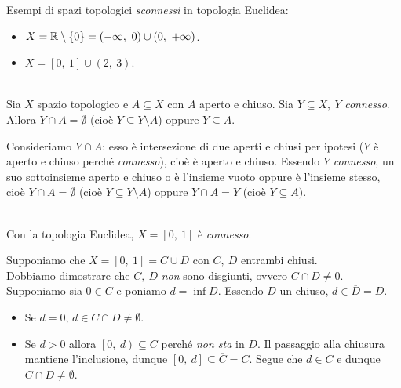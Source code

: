 \begin{examples} Esempi di spazi topologici \textit{sconnessi} in topologia Euclidea:
	\begin{itemize}
		\item $X=\realset\setminus\left\{0\right\}=\left(-\infty,\ 0\right)\cup \left(0,\ +\infty\right)$.
		\item $X=\left[0,\ 1\right]\cup \left(2,\ 3\right)$.
	\end{itemize}
\vspace{-3mm}
\end{examples}
\begin{lemming}~{}\label{connessodisgiuntoosottoinsieme}\\
Sia $X$ spazio topologico e $A\subseteq X$ con $A$ aperto e chiuso. Sia $Y\subseteq X,\ Y$ \textit{connesso}. Allora $Y\cap A=\emptyset$ (cioè $Y\subseteq Y\setminus A$) oppure $Y\subseteq A$.
\end{lemming}
\begin{demonstration}
Consideriamo $Y\cap A$: esso è intersezione di due aperti e chiusi per ipotesi ($Y$ è aperto e chiuso perché \textit{connesso}), cioè è aperto e chiuso. Essendo $Y$ \textit{connesso}, un suo sottoinsieme aperto e chiuso o è l'insieme vuoto oppure è l'insieme stesso, cioè $Y\cap A=\emptyset$ (cioè $Y\subseteq Y\setminus A$) oppure $Y\cap A=Y$ (cioè $Y\subseteq A)$.
\end{demonstration}
\begin{theorema}~{}\\
Con la topologia Euclidea, $X=\left[0,\ 1\right]$ è \textit{connesso}.
\end{theorema}
\begin{demonstration}
$  $Supponiamo che $X=\left[0,\ 1\right]=C\cup D$ con $C,\ D$ entrambi chiusi.\\
Dobbiamo dimostrare che $C,\ D$ \textit{non} sono disgiunti, ovvero $C\cap D\neq 0$. Supponiamo sia $0\in C$ e poniamo $d=\inf D$. Essendo $D$ un chiuso, $d\in \overline{D}=D$.
\begin{itemize}
	\item Se $d=0$, $d\in C\cap D\neq \emptyset$.
	\item Se $d>0$ allora $\left[0,\ d\right)\subseteq C$ perché \textit{non sta} in $D$. Il passaggio alla chiusura mantiene l'inclusione, dunque $\left[0,\ d\right]\subseteq \overline{C}=C$. Segue che $d\in C$ e dunque $C\cap D\neq \emptyset$.
\end{itemize}
\vspace{-3mm}
\end{demonstration}

